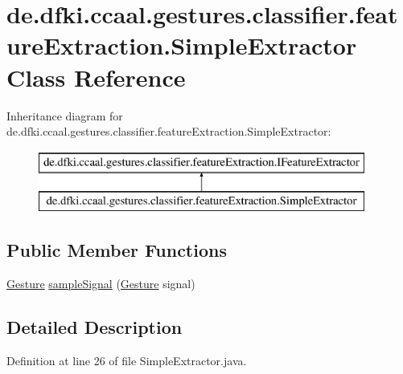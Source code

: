 \hypertarget{classde_1_1dfki_1_1ccaal_1_1gestures_1_1classifier_1_1feature_extraction_1_1_simple_extractor}{\section{de.\-dfki.\-ccaal.\-gestures.\-classifier.\-feature\-Extraction.\-Simple\-Extractor Class Reference}
\label{classde_1_1dfki_1_1ccaal_1_1gestures_1_1classifier_1_1feature_extraction_1_1_simple_extractor}
}
Inheritance diagram for de.\-dfki.\-ccaal.\-gestures.\-classifier.\-feature\-Extraction.\-Simple\-Extractor\-:\begin{figure}[H]
\begin{center}
\leavevmode
\includegraphics[height=2.000000cm]{classde_1_1dfki_1_1ccaal_1_1gestures_1_1classifier_1_1feature_extraction_1_1_simple_extractor}
\end{center}
\end{figure}
\subsection*{Public Member Functions}
\begin{DoxyCompactItemize}
\item 
\hyperlink{classde_1_1dfki_1_1ccaal_1_1gestures_1_1_gesture}{Gesture} \hyperlink{classde_1_1dfki_1_1ccaal_1_1gestures_1_1classifier_1_1feature_extraction_1_1_simple_extractor_a06767ede6f5b3393a6ce4a54934cb580}{sample\-Signal} (\hyperlink{classde_1_1dfki_1_1ccaal_1_1gestures_1_1_gesture}{Gesture} signal)
\end{DoxyCompactItemize}


\subsection{Detailed Description}


Definition at line 26 of file Simple\-Extractor.\-java.



